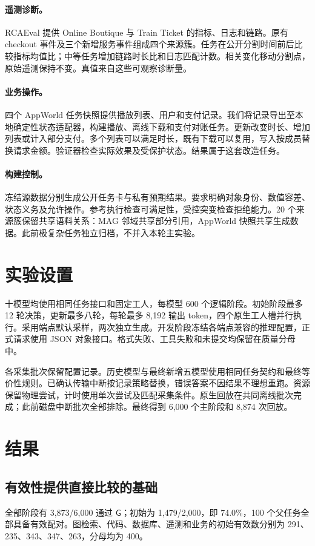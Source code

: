 \documentclass[11pt]{article}
\newcommand{\G}{\mathsf{G}}
\begin{document}
\paragraph{遥测诊断。}
RCAEval 提供 Online Boutique 与 Train Ticket 的指标、日志和链路\citep{rcaeval}。原有 checkout 事件及三个新增服务事件组成四个来源簇。任务在公开分割时间前后比较指标均值比；中等任务增加链路时长比和日志匹配计数。相关变化移动分割点，原始遥测保持不变。真值来自这些可观察诊断量。

\paragraph{业务操作。}
四个 AppWorld 任务快照提供播放列表、用户和支付记录\citep{trivedi2024appworld}。我们将记录导出至本地确定性状态适配器，构建播放、离线下载和支付对账任务。更新改变时长、增加列表或计入部分支付。多个列表可以满足时长，既有下载可以复用，写入按成员替换请求金额。验证器检查实际效果及受保护状态。结果属于这套改造任务。

\paragraph{构建控制。}
冻结源数据分别生成公开任务卡与私有预期结果。要求明确对象身份、数值容差、状态义务及允许操作。参考执行检查可满足性，受控突变检查拒绝能力。20 个来源簇保留共享语料关系：MAG 邻域共享部分引用，AppWorld 快照共享生成数据。此前极复杂任务独立归档，不并入本轮主实验。

\section{实验设置}
十模型均使用相同任务接口和固定工人，每模型 600 个逻辑阶段。初始阶段最多 12 轮决策，更新最多八轮，每轮最多 8,192 输出 token，四个原生工人槽并行执行。采用端点默认采样，两次独立生成。开发阶段冻结各端点兼容的推理配置，正式请求使用 JSON 对象接口。格式失败、工具失败和未提交均保留在质量分母中。

各采集批次保留配置记录。历史模型与最终新增五模型使用相同任务契约和最终等价性规则。已确认传输中断按记录策略替换，错误答案不因结果不理想重跑。资源保留物理尝试，计时使用单次尝试及匹配采集条件。原生回放在共同离线批次完成；此前磁盘中断批次全部排除。最终得到 6,000 个主阶段和 8,874 次回放。

\section{结果}

\subsection{有效性提供直接比较的基础}
全部阶段有 3,873/6,000 通过 $\G$；初始为 1,479/2,000，即 74.0\%，100 个父任务全部具备有效配对。图检索、代码、数据库、遥测和业务的初始有效数分别为 291、235、343、347、263，分母均为 400。
\end{document}
